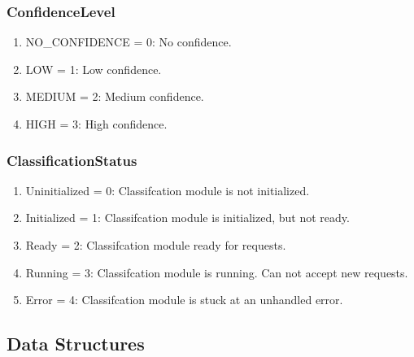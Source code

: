 \documentclass[12pt, titlepage]{article}
\begin{document}
\subsubsection{ConfidenceLevel}\label{enum:ConfidenceLevel}
\begin{enumerate}
  \item NO\_CONFIDENCE = 0: \label{enum:ConfidenceLevel:Noconfidence} No
    confidence. 
  \item LOW = 1: \label{enum:ConfidenceLevel:Low} Low confidence. 
  \item MEDIUM = 2: \label{enum:ConfidenceLevel:Medium} Medium confidence.
  \item HIGH = 3: \label{enum:ConfidenceLevel:High} High confidence.
\end{enumerate}

\subsubsection{ClassificationStatus}\label{enum:ClassificationStatus}
\begin{enumerate}
  \item Uninitialized = 0: \label{enum:ClassificationStatus:Uninitialized}
    Classifcation module is not initialized.
  \item Initialized = 1: \label{enum:ClassificationStatus:Initialized}
    Classifcation module is initialized, but not ready.
  \item Ready = 2: \label{enum:ClassificationStatus:Ready}
    Classifcation module ready for requests.
  \item Running = 3: \label{enum:ClassificationStatus:Running}
    Classifcation module is running. Can not accept new requests.
  \item Error = 4: \label{enum:Audio360ClassificationStatusStatus:Error}
    Classifcation module is stuck at an unhandled error.
\end{enumerate}

\subsection{Data Structures}
\end{document}
